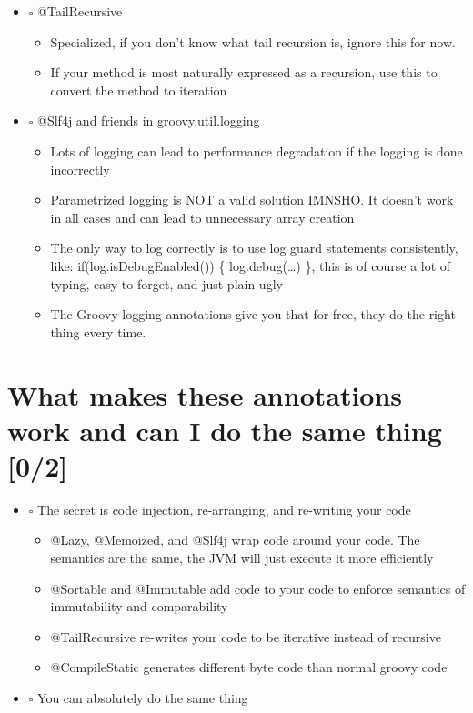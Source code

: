 \documentclass[11pt]{article}
\begin{document}
\begin{itemize}
\item $\square$ @TailRecursive

\begin{itemize}
\item Specialized, if you don't know what tail recursion is, ignore this for now.

\item If your method is most naturally expressed as a recursion, use this to convert the method to iteration
\end{itemize}

\item $\square$ @Slf4j and friends in groovy.util.logging

\begin{itemize}
\item Lots of logging can lead to performance degradation if the logging is done incorrectly

\item Parametrized logging is NOT a valid solution IMNSHO. It doesn't work in all cases and can lead to unnecessary array creation

\item The only way to log correctly is to use log guard statements consistently, like: if(log.isDebugEnabled()) \{ log.debug(\ldots{}) \}, this is of course a lot of typing, easy to forget, and just plain ugly

\item The Groovy logging annotations give you that for free, they do the right thing every time.
\end{itemize}
\end{itemize}

\section{What makes these annotations work and can I do the same thing [0/2]}
\label{sec:orgheadline7}

\begin{itemize}
\item $\square$ The secret is code injection, re-arranging, and re-writing your code

\begin{itemize}
\item @Lazy, @Memoized, and @Slf4j wrap code around your code. The semantics are the same, the JVM will just execute it more efficiently

\item @Sortable and @Immutable add code to your code to enforce semantics of immutability and comparability

\item @TailRecursive re-writes your code to be iterative instead of recursive

\item @CompileStatic generates different byte code than normal groovy code
\end{itemize}

\item $\square$ You can absolutely do the same thing
\end{itemize}
\end{document}
